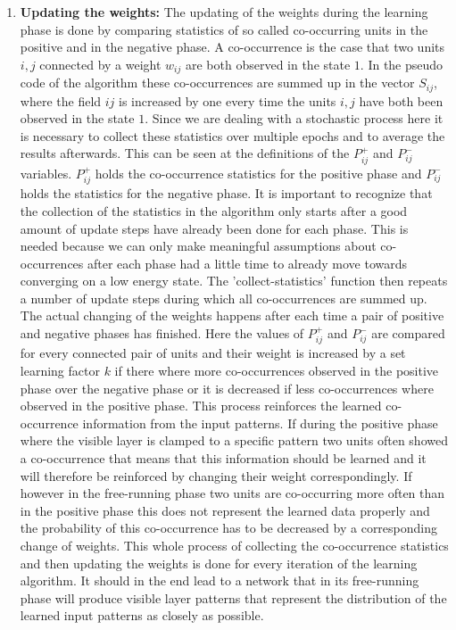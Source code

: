 \documentclass[12pt,twoside]{article}
\theoremstyle{plain}
\theoremstyle{definition}
\theoremstyle{remark}
\begin{document}
\begin{enumerate}
    \item \textbf{Updating the weights:}\newline
        The updating of the weights during the learning phase is done by comparing statistics of so called co-occurring units in the positive
        and in the negative phase. A co-occurrence is the case that two units $i,j$ connected by a weight $w_{ij}$ are both observed in the
        state $1$. In the pseudo code of the algorithm these co-occurrences are summed up in the vector $S_{ij}$, where the field $ij$ is increased
        by one every time the units $i,j$ have both been observed in the state $1$.
        Since we are dealing with a stochastic process here it is necessary to collect these statistics over multiple epochs and to average
        the results afterwards. This can be seen at the definitions of the $P^+_{ij}$ and $P^-_{ij}$ variables.\newline
        $P^+_{ij}$ holds the co-occurrence statistics for the positive phase and $P^-_{ij}$ holds the statistics for the negative phase.
        It is important to recognize that the collection of the statistics in the algorithm only starts after a good amount of 
        update steps have already been done for each phase. This is needed because we can only make meaningful assumptions about 
        co-occurrences after each phase had a little time to already move towards converging on a low energy state.
        The 'collect-statistics' function then repeats a number of update steps during which all co-occurrences are summed up.\newline
        The actual changing of the weights happens after each time a pair of positive and negative phases has finished.
        Here the values of $P^+_{ij}$ and $P^-_{ij}$ are compared for every connected pair of units and their weight
        is increased by a set learning factor $k$ if there where more co-occurrences observed in the positive phase over the negative phase
        or it is decreased if less co-occurrences where observed in the positive phase. This process reinforces the learned co-occurrence 
        information from the input patterns. If during the positive phase where the visible layer is clamped to a specific pattern
        two units often showed a co-occurrence that means that this information should be learned and it will therefore
        be reinforced by changing their weight correspondingly. If however in the free-running phase two units
        are co-occurring more often than in the positive phase this does not represent the learned data properly and
        the probability of this co-occurrence has to be decreased by a corresponding change of weights.\newline
        This whole process of collecting the co-occurrence statistics and then updating the weights is done for
        every iteration of the learning algorithm. It should in the end lead to a network that in its free-running
        phase will produce visible layer patterns that represent the distribution of the learned input patterns
        as closely as possible.


\end{enumerate}
\end{document}
